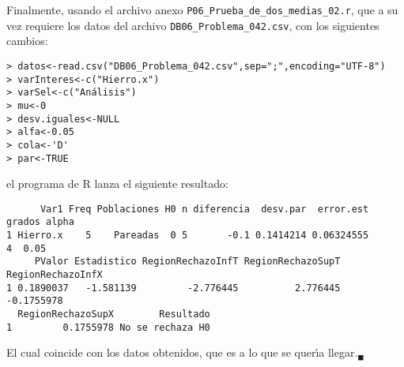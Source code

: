 \begin{solucion}
 Finalmente, usando el archivo anexo
 \texttt{P06\_Prueba\_de\_dos\_medias\_02.r},
 que a su vez requiere los datos del archivo
 \texttt{DB06\_Problema\_042.csv},
 con los siguientes cambios:
 \begin{verbatim}
> datos<-read.csv("DB06_Problema_042.csv",sep=";",encoding="UTF-8")
> varInteres<-c("Hierro.x")
> varSel<-c("Análisis")
> mu<-0
> desv.iguales<-NULL
> alfa<-0.05
> cola<-'D'
> par<-TRUE
 \end{verbatim}
 \vspace{-0.5cm}
 el programa de R lanza el siguiente resultado:
 \begin{verbatim}
      Var1 Freq Poblaciones H0 n diferencia  desv.par  error.est grados alpha
1 Hierro.x    5    Pareadas  0 5       -0.1 0.1414214 0.06324555      4  0.05
     PValor Estadistico RegionRechazoInfT RegionRechazoSupT RegionRechazoInfX
1 0.1890037   -1.581139         -2.776445          2.776445        -0.1755978
  RegionRechazoSupX        Resultado
1         0.1755978 No se rechaza H0
 \end{verbatim}
 \vspace{-0.5cm}
 El cual coincide con los datos obtenidos,
 que es a lo que se quer\'{\i}a llegar.${}_{\blacksquare}$
\end{solucion}
